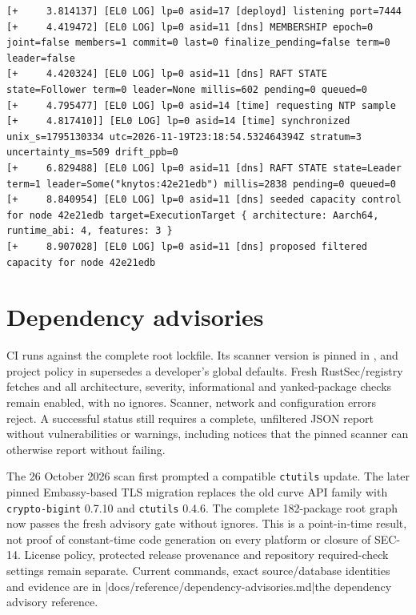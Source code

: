 \begin{verbatim}
[+     3.814137] [EL0 LOG] lp=0 asid=17 [deployd] listening port=7444
[+     4.419472] [EL0 LOG] lp=0 asid=11 [dns] MEMBERSHIP epoch=0 joint=false members=1 commit=0 last=0 finalize_pending=false term=0 leader=false
[+     4.420324] [EL0 LOG] lp=0 asid=11 [dns] RAFT STATE state=Follower term=0 leader=None millis=602 pending=0 queued=0
[+     4.795477] [EL0 LOG] lp=0 asid=14 [time] requesting NTP sample
[+     4.817410]] [EL0 LOG] lp=0 asid=14 [time] synchronized unix_s=1795130334 utc=2026-11-19T23:18:54.532464394Z stratum=3 uncertainty_ms=509 drift_ppb=0
[+     6.829488] [EL0 LOG] lp=0 asid=11 [dns] RAFT STATE state=Leader term=1 leader=Some("knytos:42e21edb") millis=2838 pending=0 queued=0
[+     8.840954] [EL0 LOG] lp=0 asid=11 [dns] seeded capacity control for node 42e21edb target=ExecutionTarget { architecture: Aarch64, runtime_abi: 4, features: 3 }
[+     8.907028] [EL0 LOG] lp=0 asid=11 [dns] proposed filtered capacity for node 42e21edb
\end{verbatim}

\section{Dependency advisories}

CI runs  against the complete root
lockfile. Its scanner version is pinned in , and project
policy in  supersedes a developer's global defaults.
Fresh RustSec/registry fetches and all architecture, severity, informational and
yanked-package checks remain enabled, with no ignores. Scanner, network and
configuration errors reject. A successful status still requires a complete,
unfiltered JSON report without vulnerabilities or warnings, including notices
that the pinned scanner can otherwise report without failing.

The 26 October 2026 scan first prompted a compatible \texttt{ctutils} update.
The later pinned Embassy-based TLS migration replaces the old curve API
family with \texttt{crypto-bigint} 0.7.10 and \texttt{ctutils} 0.4.6. The complete
182-package root graph now passes the fresh advisory gate without ignores.
This is a point-in-time result, not proof of constant-time code generation on
every platform or closure of SEC-14. License policy, protected release
provenance and repository required-check settings remain separate. Current
commands, exact source/database identities and evidence are in
\repofiletext|docs/reference/dependency-advisories.md|{the dependency advisory reference}.

